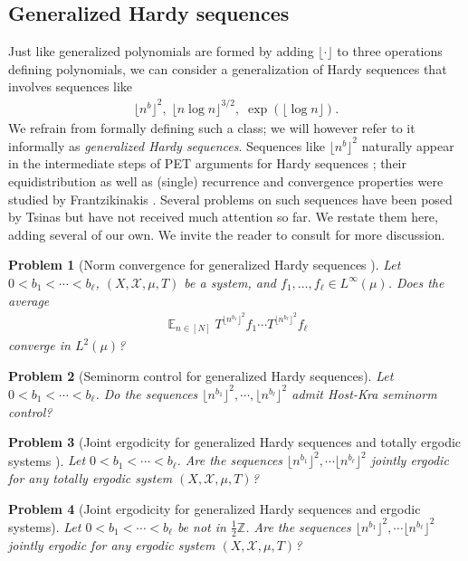 \documentclass[11pt]{amsart}
\newtheorem{problem}{Problem}
\theoremstyle{definition}
\DeclareMathOperator*{\E}{\mathbb{E}}
\newcommand{\Z}{{\mathbb Z}}
\newcommand{\CX}{{\mathcal X}}
\newcommand{\1}{{\mathbf{1}}}
\newcommand{\sfloor}[1]{{\lfloor #1 \rfloor}}
\begin{document}
    \subsection{Generalized Hardy sequences}

    Just like generalized polynomials are formed by adding $\sfloor{\cdot}$ to three operations defining polynomials, we can consider a generalization of Hardy sequences that involves sequences like
    \begin{align*}
        \sfloor{n^b}^2,\; \sfloor{n \log n}^{3/2},\; \exp(\sfloor{\log n}).
    \end{align*}
    We refrain from formally defining such a class; we will however refer to it informally as \emph{generalized Hardy sequences}. Sequences like $\sfloor{n^b}^2$ naturally appear in the intermediate steps of PET arguments for Hardy sequences \cite{DKKST24, Ts22}; their equidistribution as well as (single) recurrence and convergence properties were studied by Frantzikinakis \cite{Fr09}. Several problems on such sequences have been posed by Tsinas \cite{Ts22} but have not received much attention so far. We restate them here, adding several of our own. We invite the reader to consult \cite[Section 1.5]{Ts22} for more discussion.
    \begin{problem}[Norm convergence for generalized Hardy sequences {\cite[Conjecture 1]{Ts22}}]
        Let $0<b_1 < \cdots < b_\ell$, $(X, \CX, \mu,T)$ be a system, and $f_1, \ldots, f_\ell\in L^\infty(\mu)$. Does the average
            \begin{align*}
                \E_{n\in[N]}T^{\sfloor{n^{b_1}}^2}f_1\cdots T^{\sfloor{n^{b_\ell}}^2}f_\ell 
            \end{align*}
            converge in $L^2(\mu)$?
    \end{problem}
    \begin{problem}[Seminorm control for generalized Hardy sequences]
        Let $0<b_1 < \cdots < b_\ell$. Do the sequences $\sfloor{n^{b_1}}^2, \cdots, \sfloor{n^{b_\ell}}^2$ admit Host-Kra seminorm control?
    \end{problem}
    \begin{problem}[Joint ergodicity for generalized Hardy sequences and totally ergodic systems {\cite[Conjecture 2]{Ts22}}]
        Let $0<b_1 < \cdots < b_\ell$. Are the sequences $\sfloor{n^{b_1}}^2, \cdots \sfloor{n^{b_\ell}}^2$ jointly ergodic for any totally ergodic system $(X, \CX, \mu, T)$?
    \end{problem}
    \begin{problem}[Joint ergodicity for generalized Hardy sequences and ergodic systems]
        Let $0<b_1 < \cdots < b_\ell$ be not in $\frac{1}{2}\Z$. Are the sequences $\sfloor{n^{b_1}}^2, \cdots \sfloor{n^{b_\ell}}^2$ jointly ergodic for any ergodic system $(X, \CX, \mu, T)$?
    \end{problem}
\end{document}
